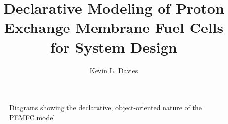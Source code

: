 \documentclass[12pt]{article}
\title{Declarative Modeling of Proton Exchange Membrane Fuel Cells \\ for System Design}
\author{Kevin L. Davies}
\subtitle
\begin{document}
\maketitle{\title}
\thispagestyle{empty}


\begin{figure}[htbp!]
\centering
{}\quad
{}
\caption{Diagrams showing the declarative, object-oriented nature of the PEMFC model}%
\end{figure}
\end{document}
